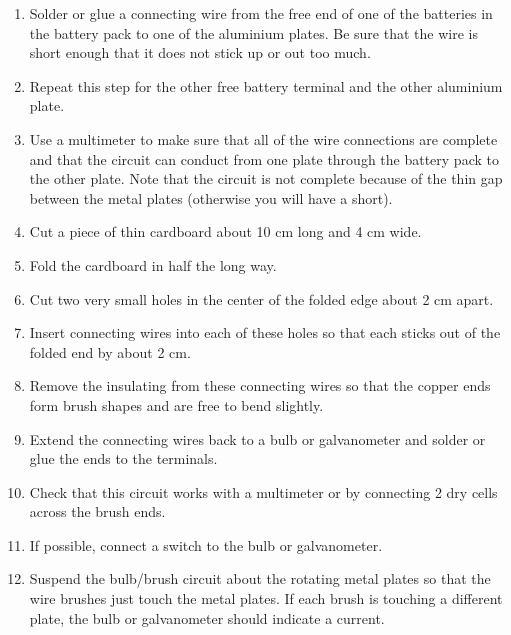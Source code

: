 \begin{enumerate}
\item{Solder or glue a connecting wire from the free end of one of the batteries in the battery pack to one of the aluminium plates. Be sure that the wire is short enough that it does not stick up or out too much.} 
\item{Repeat this step for the other free battery terminal and the other aluminium plate.} 
\item{Use a multimeter to make sure that all of the wire connections are complete and that the circuit can conduct from one plate through the battery pack to the other plate. Note that the circuit is not complete because of the thin gap between the metal plates (otherwise you will have a short).} 
\item{Cut a piece of thin cardboard about 10 cm long and 4 cm wide.} 
\item{Fold the cardboard in half the long way.} 
\item{Cut two very small holes in the center of the folded edge about 2 cm apart.} 
\item{Insert connecting wires into each of these holes so that each sticks out of the folded end by about 2 cm.} 
\item{Remove the insulating from these connecting wires so that the copper ends form brush shapes and are free to bend slightly.} 
\item{Extend the connecting wires back to a bulb or galvanometer and solder or glue the ends to the terminals.} 
\item{Check that this circuit works with a multimeter or by connecting 2 dry cells across the brush ends.} 
\item{If possible, connect a switch to the bulb or galvanometer.} 
\item{Suspend the bulb/brush circuit about the rotating metal plates so that the wire brushes just touch the metal plates. If each brush is touching a different plate, the bulb or galvanometer should indicate a current.} 
\end{enumerate}

